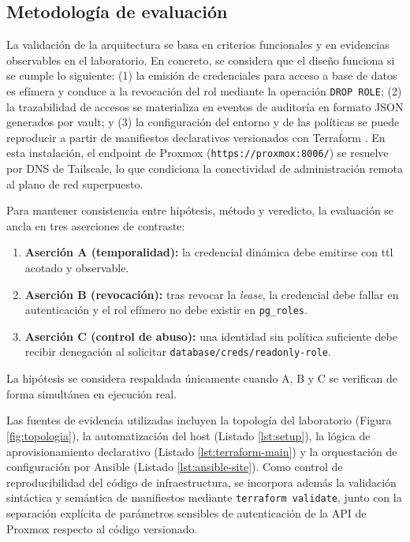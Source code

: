 \documentclass[runningheads]{llncs}
\begin{document}
\subsection{Metodología de evaluación}
La validación de la arquitectura se basa en criterios funcionales y en evidencias observables en el laboratorio. En concreto, se considera que el diseño funciona si se cumple lo siguiente: (1) la emisión de credenciales para acceso a base de datos es efímera y conduce a la revocación del rol mediante la operación \texttt{DROP ROLE}; (2) la trazabilidad de accesos se materializa en eventos de auditoría en formato JSON generados por \gls{vault}; y (3) la configuración del entorno y de las políticas se puede reproducir a partir de manifiestos declarativos versionados con Terraform \parencite{vault_database_secrets_engine,vault_audit_devices,terraform_documentation}. En esta instalación, el endpoint de Proxmox (\texttt{https://proxmox:8006/}) se resuelve por DNS de Tailscale, lo que condiciona la conectividad de administración remota al plano de red superpuesto.

Para mantener consistencia entre hipótesis, método y veredicto, la evaluación se ancla en tres aserciones de contraste:
\begin{enumerate}
    \item \textbf{Aserción A (temporalidad):} la credencial dinámica debe emitirse con \gls{ttl} acotado y observable.
    \item \textbf{Aserción B (revocación):} tras revocar la \textit{lease}, la credencial debe fallar en autenticación y el rol efímero no debe existir en \texttt{pg\_roles}.
    \item \textbf{Aserción C (control de abuso):} una identidad sin política suficiente debe recibir denegación al solicitar \texttt{database/creds/readonly-role}.
\end{enumerate}
La hipótesis se considera respaldada únicamente cuando A, B y C se verifican de forma simultánea en ejecución real.

Las fuentes de evidencia utilizadas incluyen la topología del laboratorio (Figura \ref{fig:topologia}), la automatización del host (Listado \ref{lst:setup}), la lógica de aprovisionamiento declarativo (Listado \ref{lst:terraform-main}) y la orquestación de configuración por Ansible (Listado \ref{lst:ansible-site}). Como control de reproducibilidad del código de infraestructura, se incorpora además la validación sintáctica y semántica de manifiestos mediante \texttt{terraform validate}, junto con la separación explícita de parámetros sensibles de autenticación de la API de Proxmox respecto al código versionado.
\end{document}
